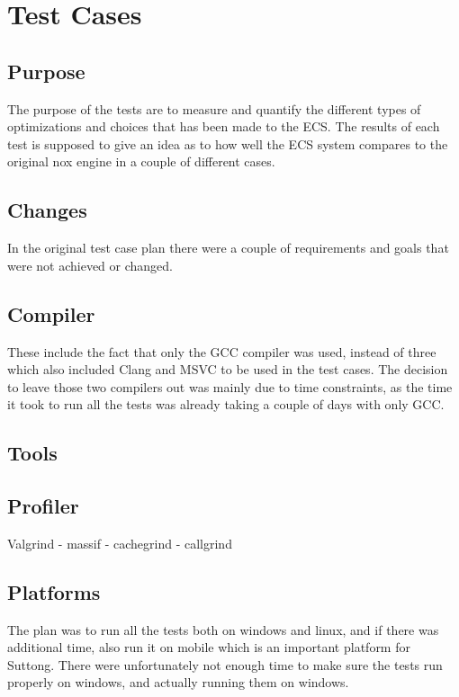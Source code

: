 \section{Test Cases}

\subsection{Purpose}
The purpose of the tests are to measure and quantify the different types of optimizations and choices that has been made to the ECS.
The results of each test is supposed to give an idea as to how well the ECS system compares to the original nox engine in a couple of different cases.

\subsection{Changes}
In the original test case plan there were a couple of requirements and goals that were not achieved or changed.

\subsection{Compiler}
These include the fact that only the GCC compiler was used, instead of three which also included Clang and MSVC to be used in the test cases.
The decision to leave those two compilers out was mainly due to time constraints, as the time it took to run all the tests was already taking a couple of days with only GCC.



\subsection{Tools}


\subsection{Profiler}
Valgrind
- massif
- cachegrind
- callgrind


\subsection{Platforms}
The plan was to run all the tests both on windows and linux, and if there was additional time, also run it on mobile which is an important platform for Suttong.
There were unfortunately not enough time to make sure the tests run properly on windows, and actually running them on windows.



